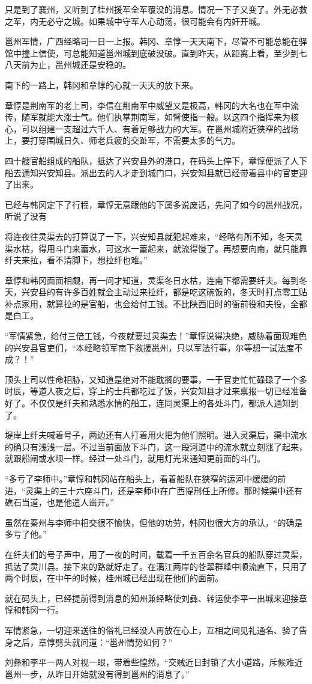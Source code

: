 只是到了襄州，又听到了桂州援军全军覆没的消息。情况一下子又变了。外无必救之军，内无必守之城。如果城中守军人心动荡，很可能会有内奸开城。

邕州军情，广西经略司一日一上报。韩冈、章惇一天天南下，尽管不可能总能在驿馆中撞上信使，可总能知道邕州城到底破没破。直到昨天，从距离上看，至少到七八天前为止，邕州城还是安稳的。

南下的一路上，韩冈和章惇的心就一天天的放下来。

章惇是荆南军的老上司，李信在荆南军中威望又是极高，韩冈的大名也在军中流传，随军就能大涨士气。他们执掌荆南军，如臂使指一般。以这四个指挥来为核心，可以组建一支超过六千人、有着足够战力的大军。在邕州城附近狭窄的战场上，要打穿围城日久、师老兵疲的交趾军，不需要太多的气力。

四十艘官船组成的船队，抵达了兴安县外的港口，在码头上停下，章惇便派了人下船去通知兴安知县。派出去的人才走到城门口，兴安知县就已经带着县中的官吏迎了出来。

已经与韩冈定下了行程，章惇无意跟他的下属多说废话，先问了如今的邕州战况，听说了没有

将连夜往灵渠去的打算说了一下，兴安知县就犯起难来，“经略有所不知，冬天灵渠水枯，得用斗门来蓄水，可这水一蓄起来，就流得慢了。再想要向南，就只能靠纤夫来拉，看不清脚下，想拉纤也难。”

章惇和韩冈面面相觑，再一问才知道，灵渠冬日水枯，连南下都需要纤夫。每到冬天，兴安县的有许多百姓就会主动过来拉纤，都是吃这碗饭的，冬天时打点零工贴补点家用，就算拉的是官船，也会给付工钱。不比陕西旧时的衙前役和夫役，全都是白工。

“军情紧急，给付三倍工钱，今夜就要过灵渠去！”章惇说得决绝，威胁着面现难色的兴安县官吏们，“本经略领军南下救援邕州，只以军法行事，尔等想一试法度不成？！”

顶头上司以性命相胁，又知道是绝对不能耽搁的要事，一干官吏忙忙碌碌了一个多时辰，等道入夜之后，穿上的士兵都吃过了饭，兴安知县才过来禀报一切已经准备好了。不仅仅是纤夫和熟悉水情的船工，连同灵渠上的各处斗门，都派人通知到了。

堤岸上纤夫喊着号子，两边还有人打着用火把为他们照明。进入灵渠后，渠中流水的确只有浅浅一层。不过当前面放下斗门，这一段河道中的流水就立刻涨了起来，就跟船闸或水坝一样。经过一处斗门，就用灯光来通知更前面的斗门。

“多亏了李师中。”章惇和韩冈站在船头上，看着船队在狭窄的运河中缓缓的前进，“灵渠上的三十六座斗门，还是李师中在广西提刑任上所修。那时候渠中还有礁石当道，也是他遣人凿开。”

虽然在秦州与李师中相交很不愉快，但他的功劳，韩冈也很大方的承认，“的确是多亏了他。”

在纤夫们的号子声中，用了一夜的时间，载着一千五百余名官兵的船队穿过灵渠，抵达了灵川县。接下来的路就好走了。在漓江两岸的苍翠群峰中顺流直下，只用了两个时辰，在中午的时候，桂州城已经出现在他们的面前。

就在码头上，已经提前得到消息的知州兼经略使刘彝、转运使李平一出城来迎接章惇和韩冈一行。

军情紧急，一切迎来送往的俗礼已经没人再放在心上，互相之间见礼通名、验了告身之后，章惇劈头就问道：“邕州情势如何？”

刘彝和李平一两人对视一眼，带着些惶然，“交贼近日封锁了大小道路，斥候难近邕州一步，从昨日开始就没有得到邕州的消息了。”

